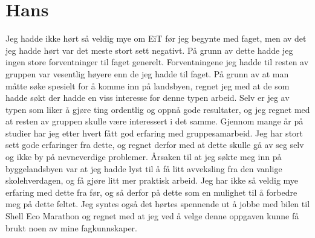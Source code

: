 \section{Hans}
Jeg hadde ikke hørt så veldig mye om EiT før jeg begynte med faget, men av det jeg hadde hørt var det meste stort sett negativt. På grunn av dette hadde jeg ingen store forventninger til faget generelt. \newline
Forventningene jeg hadde til resten av gruppen var vesentlig høyere enn de jeg hadde til faget. På grunn av at man måtte søke spesielt for å komme inn på landsbyen, regnet jeg med at de som hadde søkt der hadde en viss interesse for denne typen arbeid. Selv er jeg av typen som liker å gjøre ting ordentlig og oppnå gode resultater, og jeg regnet med at resten av gruppen skulle være interessert i det samme.\newline
Gjennom mange år på studier har jeg etter hvert fått god erfaring med gruppesamarbeid. Jeg har stort sett gode erfaringer fra dette, og regnet derfor med at dette skulle gå av seg selv og ikke by på nevneverdige problemer.\newline 
Årsaken til at jeg søkte meg inn på byggelandsbyen var at jeg hadde lyst til å få litt avveksling fra den vanlige skolehverdagen, og få gjøre litt mer praktisk arbeid. Jeg har ikke så veldig mye erfaring med dette fra før, og så derfor på dette som en mulighet til å forbedre meg på dette feltet. Jeg syntes også det hørtes spennende ut å jobbe med bilen til Shell Eco Marathon og regnet med at jeg ved å velge denne oppgaven kunne få brukt noen av mine fagkunnskaper.

